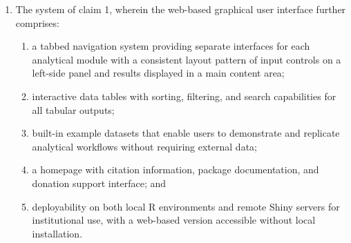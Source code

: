 \documentclass[12pt,a4paper]{article}
\begin{document}
\begin{enumerate}[leftmargin=3em, labelsep=1em, itemsep=12pt]
\item The system of claim 1, wherein the web-based graphical user interface further comprises:
\begin{enumerate}[label=\alph*., leftmargin=2em, itemsep=2pt]
\item a tabbed navigation system providing separate interfaces for each analytical module with a consistent layout pattern of input controls on a left-side panel and results displayed in a main content area;
\item interactive data tables with sorting, filtering, and search capabilities for all tabular outputs;
\item built-in example datasets that enable users to demonstrate and replicate analytical workflows without requiring external data;
\item a homepage with citation information, package documentation, and donation support interface; and
\item deployability on both local R environments and remote Shiny servers for institutional use, with a web-based version accessible without local installation.
\end{enumerate}


\end{enumerate}
\end{document}

